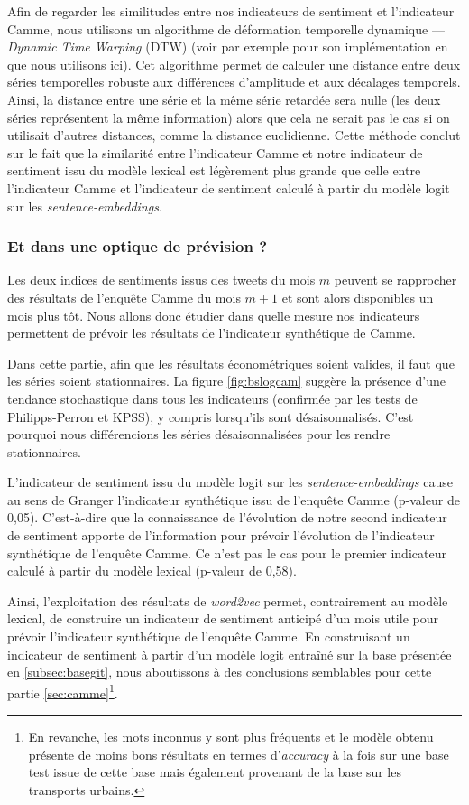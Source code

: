 \documentclass[11pt,french,french]{article}
\let\rmarkdownfootnote\footnote%
\def\footnote{\protect\rmarkdownfootnote}
\begin{document}
Afin de regarder les similitudes entre nos indicateurs de sentiment et
l'indicateur Camme, nous utilisons un algorithme de déformation
temporelle dynamique --- \emph{Dynamic Time Warping} (DTW) (voir par
exemple \cite{dtw} pour son implémentation en \faRProject{} que nous
utilisons ici). Cet algorithme permet de calculer une distance entre
deux séries temporelles robuste aux différences d'amplitude et aux
décalages temporels. Ainsi, la distance entre une série et la même série
retardée sera nulle (les deux séries représentent la même information)
alors que cela ne serait pas le cas si on utilisait d'autres distances,
comme la distance euclidienne. Cette méthode conclut sur le fait que la
similarité entre l'indicateur Camme et notre indicateur de sentiment
issu du modèle lexical est légèrement plus grande que celle entre
l'indicateur Camme et l'indicateur de sentiment calculé à partir du
modèle logit sur les \emph{sentence-embeddings}.

\subsubsection{Et dans une optique de prévision
?}\label{et-dans-une-optique-de-pruxe9vision}

Les deux indices de sentiments issus des tweets du mois \(m\) peuvent se
rapprocher des résultats de l'enquête Camme du mois \(m+1\) et sont
alors disponibles un mois plus tôt. Nous allons donc étudier dans quelle
mesure nos indicateurs permettent de prévoir les résultats de
l'indicateur synthétique de Camme.

Dans cette partie, afin que les résultats économétriques soient valides,
il faut que les séries soient stationnaires. La figure
\ref{fig:bslogcam} suggère la présence d'une tendance stochastique dans
tous les indicateurs (confirmée par les tests de Philipps-Perron et
KPSS), y compris lorsqu'ils sont désaisonnalisés. C'est pourquoi nous
différencions les séries désaisonnalisées pour les rendre stationnaires.

L'indicateur de sentiment issu du modèle logit sur les
\emph{sentence-embeddings} cause au sens de Granger l'indicateur
synthétique issu de l'enquête Camme (p-valeur de 0,05). C'est-à-dire que
la connaissance de l'évolution de notre second indicateur de sentiment
apporte de l'information pour prévoir l'évolution de l'indicateur
synthétique de l'enquête Camme. Ce n'est pas le cas pour le premier
indicateur calculé à partir du modèle lexical (p-valeur de 0,58).

Ainsi, l'exploitation des résultats de \emph{word2vec} permet,
contrairement au modèle lexical, de construire un indicateur de
sentiment anticipé d'un mois utile pour prévoir l'indicateur synthétique
de l'enquête Camme. En construisant un indicateur de sentiment à partir
d'un modèle logit entraîné sur la base présentée en
\ref{subsec:basegit}, nous aboutissons à des conclusions semblables pour
cette partie \ref{sec:camme}\footnote{En revanche, les mots inconnus y
  sont plus fréquents et le modèle obtenu présente de moins bons
  résultats en termes d'\emph{accuracy} à la fois sur une base test
  issue de cette base mais également provenant de la base sur les
  transports urbains.}.
\end{document}
